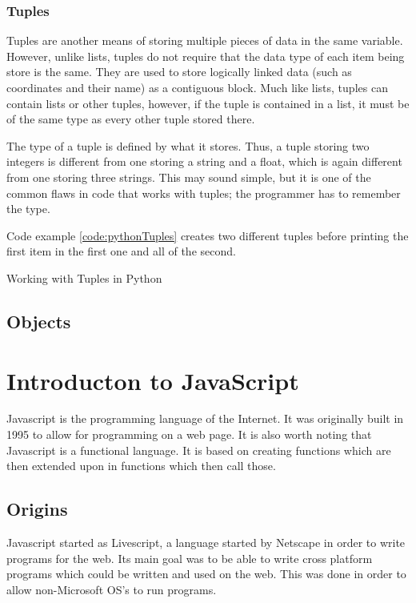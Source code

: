 			\subsubsection{Tuples}
				Tuples are another means of storing multiple pieces of data in the same variable.
				However, unlike lists, tuples do not require that the data type of each item being store is the same.
				They are used to store logically linked data (such as coordinates and their name) as a contiguous block.
				Much like lists, tuples can contain lists or other tuples, however, if the tuple is contained in a list,
				it must be of the same type as every other tuple stored there.

				The type of a tuple is defined by what it stores.
				Thus, a tuple storing two integers is different from one storing a string and a float, which is again different from one storing three strings.
				This may sound simple, but it is one of the common flaws in code that works with tuples; the programmer has to remember the type.

				Code example \ref{code:pythonTuples} creates two different tuples before printing the first item in the first one and all of the second.
				\begin{code}
					\centering
					\caption{Working with Tuples in Python}
					\label{code:pythonTuples}
				\end{code}
		\subsection{Objects}

	\section{Introducton to JavaScript}
		Javascript is the programming language of the Internet.
		It was originally built in 1995 to allow for programming on a web page.
		It is also worth noting that Javascript is a functional language\cite{JSProgrammingLanguage}.
		It is based on creating functions which are then extended upon in functions which then call those.

		\subsection{Origins}
		 
			Javascript started as Livescript, a language started by Netscape in order to write programs for the web.
			Its main goal was to be able to write cross platform programs which could be written and used on the web.
			This was done in order to allow non-Microsoft OS's to run programs.

